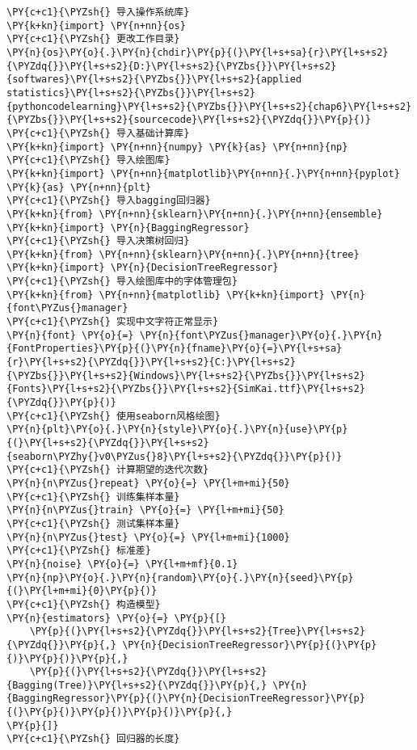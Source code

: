 \begin{Verbatim}[commandchars=\\\{\}]
\PY{c+c1}{\PYZsh{} 导入操作系统库}
\PY{k+kn}{import} \PY{n+nn}{os}
\PY{c+c1}{\PYZsh{} 更改工作目录}
\PY{n}{os}\PY{o}{.}\PY{n}{chdir}\PY{p}{(}\PY{l+s+sa}{r}\PY{l+s+s2}{\PYZdq{}}\PY{l+s+s2}{D:}\PY{l+s+s2}{\PYZbs{}}\PY{l+s+s2}{softwares}\PY{l+s+s2}{\PYZbs{}}\PY{l+s+s2}{applied statistics}\PY{l+s+s2}{\PYZbs{}}\PY{l+s+s2}{pythoncodelearning}\PY{l+s+s2}{\PYZbs{}}\PY{l+s+s2}{chap6}\PY{l+s+s2}{\PYZbs{}}\PY{l+s+s2}{sourcecode}\PY{l+s+s2}{\PYZdq{}}\PY{p}{)}
\PY{c+c1}{\PYZsh{} 导入基础计算库}
\PY{k+kn}{import} \PY{n+nn}{numpy} \PY{k}{as} \PY{n+nn}{np}
\PY{c+c1}{\PYZsh{} 导入绘图库}
\PY{k+kn}{import} \PY{n+nn}{matplotlib}\PY{n+nn}{.}\PY{n+nn}{pyplot} \PY{k}{as} \PY{n+nn}{plt}
\PY{c+c1}{\PYZsh{} 导入bagging回归器}
\PY{k+kn}{from} \PY{n+nn}{sklearn}\PY{n+nn}{.}\PY{n+nn}{ensemble} \PY{k+kn}{import} \PY{n}{BaggingRegressor}
\PY{c+c1}{\PYZsh{} 导入决策树回归}
\PY{k+kn}{from} \PY{n+nn}{sklearn}\PY{n+nn}{.}\PY{n+nn}{tree} \PY{k+kn}{import} \PY{n}{DecisionTreeRegressor}
\PY{c+c1}{\PYZsh{} 导入绘图库中的字体管理包}
\PY{k+kn}{from} \PY{n+nn}{matplotlib} \PY{k+kn}{import} \PY{n}{font\PYZus{}manager}
\PY{c+c1}{\PYZsh{} 实现中文字符正常显示}
\PY{n}{font} \PY{o}{=} \PY{n}{font\PYZus{}manager}\PY{o}{.}\PY{n}{FontProperties}\PY{p}{(}\PY{n}{fname}\PY{o}{=}\PY{l+s+sa}{r}\PY{l+s+s2}{\PYZdq{}}\PY{l+s+s2}{C:}\PY{l+s+s2}{\PYZbs{}}\PY{l+s+s2}{Windows}\PY{l+s+s2}{\PYZbs{}}\PY{l+s+s2}{Fonts}\PY{l+s+s2}{\PYZbs{}}\PY{l+s+s2}{SimKai.ttf}\PY{l+s+s2}{\PYZdq{}}\PY{p}{)}
\PY{c+c1}{\PYZsh{} 使用seaborn风格绘图}
\PY{n}{plt}\PY{o}{.}\PY{n}{style}\PY{o}{.}\PY{n}{use}\PY{p}{(}\PY{l+s+s2}{\PYZdq{}}\PY{l+s+s2}{seaborn\PYZhy{}v0\PYZus{}8}\PY{l+s+s2}{\PYZdq{}}\PY{p}{)}
\PY{c+c1}{\PYZsh{} 计算期望的迭代次数}
\PY{n}{n\PYZus{}repeat} \PY{o}{=} \PY{l+m+mi}{50}
\PY{c+c1}{\PYZsh{} 训练集样本量}
\PY{n}{n\PYZus{}train} \PY{o}{=} \PY{l+m+mi}{50}
\PY{c+c1}{\PYZsh{} 测试集样本量}
\PY{n}{n\PYZus{}test} \PY{o}{=} \PY{l+m+mi}{1000}
\PY{c+c1}{\PYZsh{} 标准差}
\PY{n}{noise} \PY{o}{=} \PY{l+m+mf}{0.1}
\PY{n}{np}\PY{o}{.}\PY{n}{random}\PY{o}{.}\PY{n}{seed}\PY{p}{(}\PY{l+m+mi}{0}\PY{p}{)}
\PY{c+c1}{\PYZsh{} 构造模型}
\PY{n}{estimators} \PY{o}{=} \PY{p}{[}
    \PY{p}{(}\PY{l+s+s2}{\PYZdq{}}\PY{l+s+s2}{Tree}\PY{l+s+s2}{\PYZdq{}}\PY{p}{,} \PY{n}{DecisionTreeRegressor}\PY{p}{(}\PY{p}{)}\PY{p}{)}\PY{p}{,}
    \PY{p}{(}\PY{l+s+s2}{\PYZdq{}}\PY{l+s+s2}{Bagging(Tree)}\PY{l+s+s2}{\PYZdq{}}\PY{p}{,} \PY{n}{BaggingRegressor}\PY{p}{(}\PY{n}{DecisionTreeRegressor}\PY{p}{(}\PY{p}{)}\PY{p}{)}\PY{p}{)}\PY{p}{,}
\PY{p}{]}
\PY{c+c1}{\PYZsh{} 回归器的长度}

\end{Verbatim}
